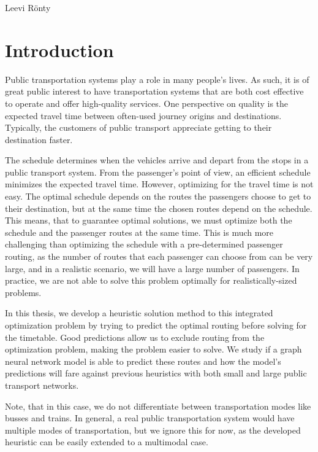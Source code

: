 \documentclass[english, 12pt, a4paper, sci, utf8, a-2b, online]{aaltothesis}
\begin{document}
\vspace{5mm}
{\hfill Leevi Rönty \hspace{1cm}}

\newpage
\thesistableofcontents

\cleardoublepage
\section{Introduction}
\label{sec:intro}

Public transportation systems play a role in many people's lives. As such, it is of great public interest to have transportation systems that are both cost effective to operate and offer high-quality services. One perspective on quality is the expected travel time between often-used journey origins and destinations. Typically, the customers of public transport appreciate getting to their destination faster. 

The schedule determines when the vehicles arrive and depart from the stops in a public transport system. From the passenger's point of view, an efficient schedule minimizes the expected travel time. However, optimizing for the travel time is not easy. The optimal schedule depends on the routes the passengers choose to get to their destination, but at the same time the chosen routes depend on the schedule. This means, that to guarantee optimal solutions, we must optimize both the schedule and the passenger routes at the same time. This is much more challenging than optimizing the schedule with a pre-determined passenger routing, as the number of routes that each passenger can choose from can be very large, and in a realistic scenario, we will have a large number of passengers. In practice, we are not able to solve this problem optimally for realistically-sized problems.

In this thesis, we develop a heuristic solution method to this integrated optimization problem by trying to predict the optimal routing before solving for the timetable. Good predictions allow us to exclude routing from the optimization problem, making the problem easier to solve. We study if a graph neural network model is able to predict these routes and how the model's predictions will fare against previous heuristics with both small and large public transport networks.

Note, that in this case, we do not differentiate between transportation modes
like busses and trains. In general, a real public transportation system would have multiple modes of transportation, but we ignore this for now, as the developed heuristic can be easily extended to a multimodal case. 
\end{document}
